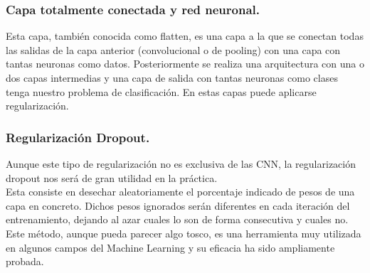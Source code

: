 \documentclass[a4paper,11pt]{article}
\begin{document}
\subsubsection{Capa totalmente conectada y red neuronal.}
Esta capa, también conocida como flatten, es una capa a la que se conectan todas las salidas de la capa anterior (convolucional o de pooling) con una capa con tantas neuronas como datos. Posteriormente se realiza una arquitectura con una o dos capas intermedias y una capa de salida con tantas neuronas como clases tenga nuestro problema de clasificación. En estas capas puede aplicarse regularización.
\subsubsection{Regularización Dropout.}
Aunque este tipo de regularización no es exclusiva de las CNN, la regularización dropout nos será de gran utilidad en la práctica. \\

\noindent
Esta consiste en desechar aleatoriamente el porcentaje indicado de pesos de una capa en concreto. Dichos pesos ignorados serán diferentes en cada iteración del entrenamiento, dejando al azar cuales lo son de forma consecutiva y cuales no.\\ 

\noindent
Este método, aunque pueda parecer algo tosco, es una herramienta muy utilizada en algunos campos del Machine Learning y su eficacia ha sido ampliamente probada.
\end{document}
